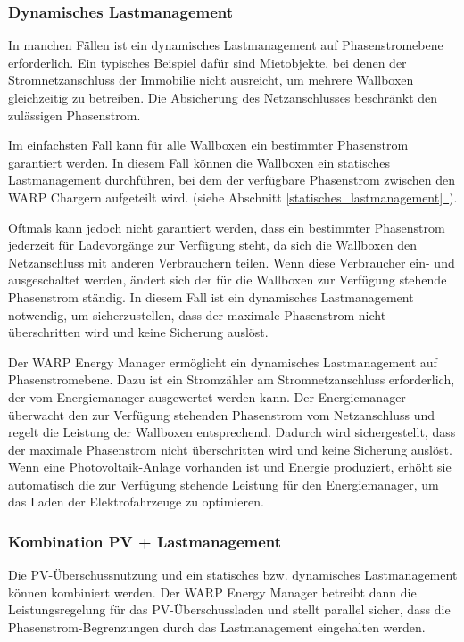 \documentclass[a4paper,10pt]{article}
\newcommand*{\fullref}[1]{Abschnitt \hyperref[{#1}]{\ref*{#1}~\nameref*{#1}}}
\begin{document}
\begin{multicols*}{2}
	\subsubsection{Dynamisches Lastmanagement}
	\label{dynamisches_lastmanagement}

	In manchen Fällen ist ein dynamisches Lastmanagement auf Phasenstromebene erforderlich.
	Ein typisches Beispiel dafür sind Mietobjekte, bei denen der Stromnetzanschluss der
	Immobilie nicht ausreicht, um mehrere Wallboxen gleichzeitig zu betreiben.
	Die Absicherung des Netzanschlusses beschränkt den zulässigen Phasenstrom.

	Im einfachsten Fall kann für alle Wallboxen ein bestimmter Phasenstrom garantiert werden.
	In diesem Fall können die Wallboxen ein statisches Lastmanagement durchführen,
	bei dem der verfügbare Phasenstrom zwischen den WARP Chargern aufgeteilt wird. (siehe \fullref{statisches_lastmanagement}).

	Oftmals kann jedoch nicht garantiert werden, dass ein bestimmter Phasenstrom jederzeit
	für Ladevorgänge zur Verfügung steht, da sich die Wallboxen den Netzanschluss mit anderen Verbrauchern teilen.
	Wenn diese Verbraucher ein- und ausgeschaltet werden,
	ändert sich der für die Wallboxen zur Verfügung stehende Phasenstrom
	ständig. In diesem Fall ist ein dynamisches Lastmanagement notwendig, um
	sicherzustellen, dass der maximale Phasenstrom nicht überschritten wird und
	keine Sicherung auslöst.

	Der WARP Energy Manager ermöglicht ein dynamisches Lastmanagement auf Phasenstromebene.
	Dazu ist ein Stromzähler am Stromnetzanschluss erforderlich, der vom Energiemanager
	ausgewertet werden kann. Der Energiemanager überwacht den zur Verfügung stehenden
	Phasenstrom vom Netzanschluss und regelt die Leistung der Wallboxen entsprechend.
	Dadurch wird sichergestellt, dass der maximale Phasenstrom nicht überschritten wird
	und keine Sicherung auslöst. Wenn eine Photovoltaik-Anlage vorhanden ist und Energie
	produziert, erhöht sie automatisch die zur Verfügung stehende Leistung für den
	Energiemanager, um das Laden der Elektrofahrzeuge zu optimieren.

	\subsubsection{Kombination PV + Lastmanagement}
	Die PV-Überschussnutzung und ein statisches bzw. dynamisches Lastmanagement können
	kombiniert werden. Der WARP Energy Manager betreibt dann die
	Leistungsregelung für das PV-Überschussladen und stellt parallel sicher, dass die
	Phasenstrom-Begrenzungen durch das Lastmanagement eingehalten werden.


\end{multicols*}
\end{document}
